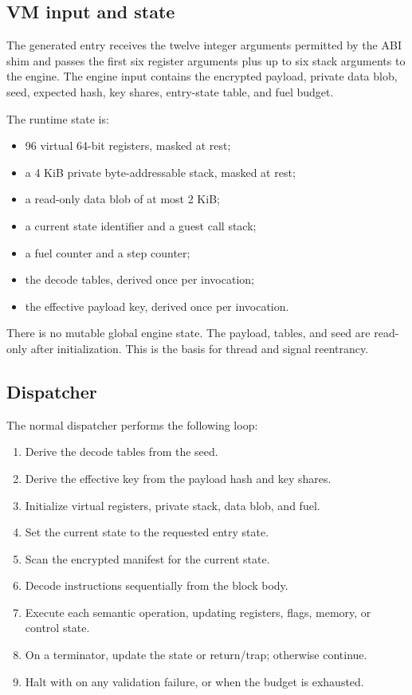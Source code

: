 \subsection{VM input and state}

The generated entry receives the twelve integer arguments permitted by the ABI
shim and passes the first six register arguments plus up to six stack arguments
to the engine. The engine input contains the encrypted payload, private data
blob, seed, expected hash, key shares, entry-state table, and fuel budget.

The runtime state is:

\begin{itemize}
  \item 96 virtual 64-bit registers, masked at rest;
  \item a 4 KiB private byte-addressable stack, masked at rest;
  \item a read-only data blob of at most 2 KiB;
  \item a current state identifier and a guest call stack;
  \item a fuel counter and a step counter;
  \item the decode tables, derived once per invocation;
  \item the effective payload key, derived once per invocation.
\end{itemize}

There is no mutable global engine state. The payload, tables, and seed are
read-only after initialization. This is the basis for thread and signal
reentrancy.

\subsection{Dispatcher}

The normal dispatcher performs the following loop:

\begin{enumerate}
  \item Derive the decode tables from the seed.
  \item Derive the effective key from the payload hash and key shares.
  \item Initialize virtual registers, private stack, data blob, and fuel.
  \item Set the current state to the requested entry state.
  \item Scan the encrypted manifest for the current state.
  \item Decode instructions sequentially from the block body.
  \item Execute each semantic operation, updating registers, flags, memory, or
        control state.
  \item On a terminator, update the state or return/trap; otherwise continue.
  \item Halt with  on any validation failure, or
         when the budget is exhausted.
\end{enumerate}

